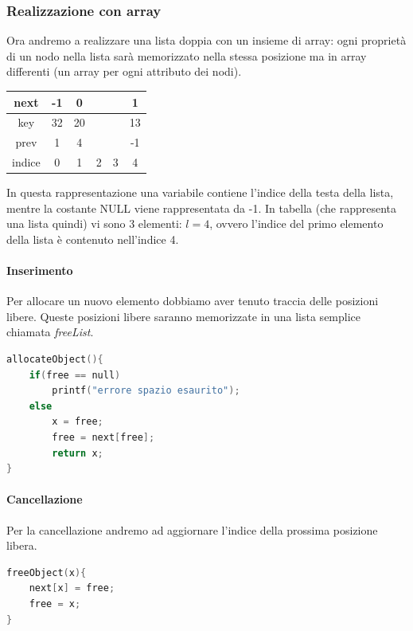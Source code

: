 \documentclass[italian]{article}
\newcommand{\dateright}[1]{\normalfont{\normalsize{\hfill #1 \\}}}
\begin{document}
\subsubsection{Realizzazione con array}
\dateright{10 Novembre 2016}
Ora andremo a realizzare una lista doppia con un insieme di array: ogni proprietà di un nodo nella lista sarà memorizzato nella stessa posizione ma in array differenti (un array per ogni attributo dei nodi).
\begin{table}[h]
	\centering
	\begin{tabular}{cccccc}
		\hline
		\multicolumn{1}{|c|}{next} & \multicolumn{1}{c|}{-1}  & \multicolumn{1}{c|}{0}  & \multicolumn{1}{c|}{} & \multicolumn{1}{c|}{} & \multicolumn{1}{c|}{1}  \\ \hline
		\multicolumn{1}{|c|}{key}  & \multicolumn{1}{c|}{32} & \multicolumn{1}{c|}{20} & \multicolumn{1}{c|}{} & \multicolumn{1}{c|}{} & \multicolumn{1}{c|}{13} \\ \hline
		\multicolumn{1}{|c|}{prev} & \multicolumn{1}{c|}{1}  & \multicolumn{1}{c|}{4}  & \multicolumn{1}{c|}{} & \multicolumn{1}{c|}{} & \multicolumn{1}{c|}{-1}  \\ \hline
		indice                     & 0                       & 1                       & 2                     & 3                     & 4                      
	\end{tabular}
\end{table}
In questa rappresentazione una variabile contiene l’indice della testa della lista, mentre la costante NULL viene rappresentata da -1.
In tabella (che rappresenta una lista quindi) vi sono 3 elementi: $l = 4$, ovvero l’indice del primo elemento della lista è contenuto nell’indice 4. 
\paragraph{Inserimento}
Per allocare un nuovo elemento dobbiamo aver tenuto traccia delle posizioni libere. Queste posizioni libere saranno memorizzate in una lista semplice chiamata \textit{freeList}.
\begin{lstlisting}[language=c,mathescape=true]
allocateObject(){
	if(free == null)
		printf("errore spazio esaurito");
	else
		x = free;
		free = next[free];
		return x;
}
\end{lstlisting}
\paragraph{Cancellazione}
Per la cancellazione andremo ad aggiornare l'indice della prossima posizione libera.
\begin{lstlisting}[language=c,mathescape=true]
freeObject(x){
	next[x] = free;
	free = x;
}
\end{lstlisting}
\pagebreak
\end{document}
